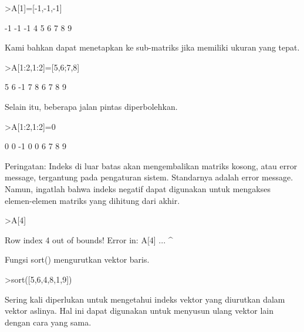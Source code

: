 \documentclass[a4paper,10pt]{article}
\begin{document}
\begin{eulernotebook}
\begin{eulercomment}
\end{eulercomment}
\begin{eulerprompt}
>A[1]=[-1,-1,-1]
\end{eulerprompt}
\begin{euleroutput}
             -1            -1            -1 
              4             5             6 
              7             8             9 
\end{euleroutput}
\begin{eulercomment}
Kami bahkan dapat menetapkan ke sub-matriks jika memiliki ukuran yang
tepat.
\end{eulercomment}
\begin{eulerprompt}
>A[1:2,1:2]=[5,6;7,8]
\end{eulerprompt}
\begin{euleroutput}
              5             6            -1 
              7             8             6 
              7             8             9 
\end{euleroutput}
\begin{eulercomment}
Selain itu, beberapa jalan pintas diperbolehkan.
\end{eulercomment}
\begin{eulerprompt}
>A[1:2,1:2]=0
\end{eulerprompt}
\begin{euleroutput}
              0             0            -1 
              0             0             6 
              7             8             9 
\end{euleroutput}
\begin{eulercomment}
Peringatan: Indeks di luar batas akan mengembalikan matriks kosong,
atau error message, tergantung pada pengaturan sistem. Standarnya
adalah error message. Namun, ingatlah bahwa indeks negatif dapat
digunakan untuk mengakses elemen-elemen matriks yang dihitung dari
akhir.
\end{eulercomment}
\begin{eulerprompt}
>A[4]
\end{eulerprompt}
\begin{euleroutput}
  Row index 4 out of bounds!
  Error in:
  A[4] ...
      ^
\end{euleroutput}
\begin{eulercomment}
Fungsi sort() mengurutkan vektor baris.
\end{eulercomment}
\begin{eulerprompt}
>sort([5,6,4,8,1,9])
\end{eulerprompt}
\begin{euleroutput}
  [1,  4,  5,  6,  8,  9]
\end{euleroutput}
\begin{eulercomment}
Sering kali diperlukan untuk mengetahui indeks vektor yang diurutkan
dalam vektor aslinya. Hal ini dapat digunakan untuk menyusun ulang
vektor lain dengan cara yang sama.


\end{eulercomment}
\end{eulernotebook}
\end{document}
